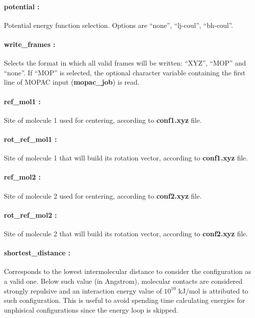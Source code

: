 \documentclass[10pt,a4paper]{report}
\begin{document}
\paragraph{potential :} 

Potential energy function selection. Options are ``none'', ``lj-coul'', ``bh-coul''. 

\paragraph{write\_frames :} 

Selects the format in which all valid frames will be written: ``XYZ'', ``MOP'' and ``none''. 
If ``MOP'' is selected, the optional character variable containing the first line of MOPAC 
input (\textbf{mopac\_job}) is read. 

\paragraph{ref\_mol1 :} 

Site of molecule 1 used for centering, according to \textbf{conf1.xyz} file. 

\paragraph{rot\_ref\_mol1 :} 

Site of molecule 1 that will build its rotation vector, according to \textbf{conf1.xyz} file. 

\paragraph{ref\_mol2 :} 

Site of molecule 2 used for centering, according to \textbf{conf2.xyz} file. 

\paragraph{rot\_ref\_mol2 :} 

Site of molecule 2 that will build its rotation vector, according to \textbf{conf2.xyz} file. 

\paragraph{shortest\_distance :} 

Corresponds to the lowest intermolecular distance to consider the configuration as a valid one. 
Below such value (in Angstrom), molecular contacts are considered strongly repulsive and an 
interaction energy value of $10^{10}$ kJ/mol is attributed  to such configuration. This is useful 
to avoid spending time calculating energies for unphisical configurations since the energy loop 
is skipped.
\end{document}
